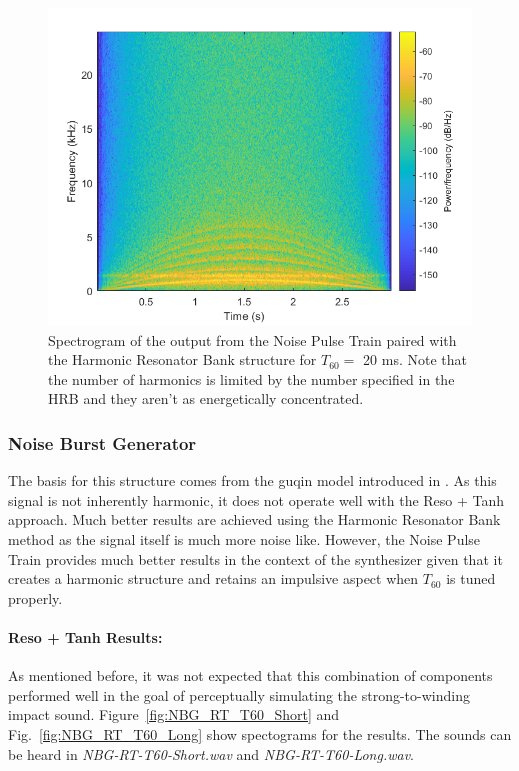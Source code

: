 \documentclass[../main.tex]{subfiles}
\begin{document}
\begin{figure}[h]
    \centering
    \includegraphics[scale=.65]{./images/plots/NPTHRBT60Long.png}
    \caption{Spectrogram of the output from the Noise Pulse Train paired with the Harmonic Resonator Bank structure for $T_{60} = $ 20 ms. Note that the number of harmonics is limited by the number specified in the HRB and they aren't as energetically concentrated.}
    \label{fig:NPT_HRB_T60_Long}
\end{figure}


\subsubsection{Noise Burst Generator}
The basis for this structure comes from the guqin model introduced in . As this signal is not inherently harmonic, it does not operate well with the Reso + Tanh approach. Much better results are achieved using the Harmonic Resonator Bank method as the signal itself is much more noise like. However, the Noise Pulse Train provides much better results in the context of the synthesizer given that it creates a harmonic structure and retains an impulsive aspect when $T_{60}$ is tuned properly.

\paragraph{Reso + Tanh Results:}
As mentioned before, it was not expected that this combination of components performed well in the goal of perceptually simulating the strong-to-winding impact sound. Figure~\ref{fig:NBG_RT_T60_Short} and Fig.~\ref{fig:NBG_RT_T60_Long} show spectograms for the results. The sounds can be heard in \emph{NBG-RT-T60-Short.wav} and \emph{NBG-RT-T60-Long.wav}.
\end{document}

